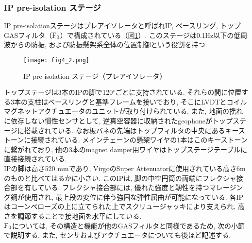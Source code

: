 \subsubsection{IP pre-isolation ステージ}
\vskip3mm
IP pre-isolationステージはプレアイソレータと呼ばれIP, ベースリング, トップGASフィルタ（$\rm{F_0}$）で構成されている（図\ref{fig4.2}）. このステージは0.1Hz以下の低周波からの防振, および防振懸架系全体の位置制御という役割を持つ. 
\begin{figure}[H]
\begin{center}
\texttt{[image: fig4\_2.png]}
\caption[IP pre-isolation ステージ]{IP pre-isolation ステージ（プレアイソレータ）}
\label{fig4.2}
\end{center}
\end{figure}
トップステージは3本のIPの脚で120$^{\circ}$ごとに支持されている. それらの間に位置する3本の支柱はベースリングと基準フレームを接いでおり, そこにLVDTとコイルマグネットアクチュエータのユニットが取り付けられている. また, 地面の揺れに依存しない慣性センサとして, 逆真空容器に収納されたgeophoneがトップステージに搭載されている. なお板バネの先端はトップフィルタの中央にあるキーストーンに接続されている. メインチェーンの懸架ワイヤの1本はこのキーストーンに繋がれており, 他の3本のmagnet damper用ワイヤはトップステージテーブルに直接接続されている. \\
\quad IPの脚は高さ520 mmであり, VirgoのSuper Attenuator\cite{Virgo}に使用されている高さ6mのものと比べてはるかに小さい. このIPは, 脚の中空円筒の両端にフレクシャ接合部を有している. フレクシャ接合部には, 優れた強度と靭性を持つマレージング鋼が使用され, 最上段の変位に伴う強固な弾性屈曲が可能になっている. 各IPはコーンベローズの上に立てられた上でスクリュージャッキにより支えられ, 高さを調節することで接地面を水平にしている. \\
\quad $\rm{F_0}$については, その構造と機能が他のGASフィルタと同様であるため, 次の小節で説明する. また, センサおよびアクチュエータについても後ほど記述する. 
